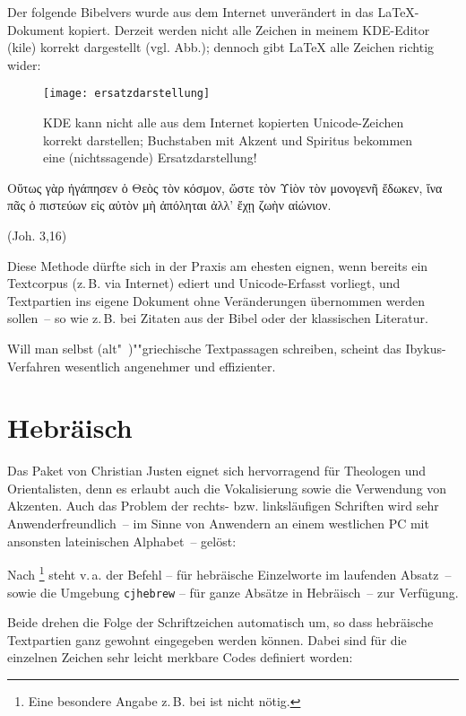 Der folgende Bibelvers wurde aus dem Internet unverändert in das \LaTeX-Dokument
kopiert. Derzeit werden nicht alle Zeichen in meinem KDE-Editor (kile) korrekt dargestellt (vgl. Abb.);
dennoch gibt \LaTeX{} alle Zeichen richtig wider:

\begin{figure}
 \texttt{[image: ersatzdarstellung]}
 \caption{KDE kann nicht alle aus dem Internet kopierten Unicode-Zeichen korrekt darstellen;
 Buchstaben mit Akzent und Spiritus bekommen eine (nichtssagende) Ersatzdarstellung!}
\end{figure}


\begin{otherlanguage}{polutonikogreek}
Οὕτως γὰρ ἠγάπησεν ὁ Θεὸς τὸν κόσμον, ὥστε τὸν Υἱὸν τὸν μονογενῆ ἔδωκεν,
ἵνα πᾶς ὁ πιστεύων εἰς αὐτὸν μὴ ἀπόληται ἀλλ’ ἔχῃ ζωὴν αἰώνιον.
\end{otherlanguage}
(Joh. 3,16)

Diese Methode dürfte sich in der Praxis am ehesten eignen, wenn bereits ein Textcorpus
(z.\,B. via Internet) ediert und Unicode-Erfasst vorliegt, und Textpartien ins eigene Dokument
ohne Veränderungen übernommen werden sollen~-- so wie z.\,B. bei Zitaten aus der Bibel oder
der klassischen Literatur.

Will man selbst (alt"~)""griechische Textpassagen schreiben, scheint das Ibykus-Verfahren
wesentlich angenehmer und effizienter.


\section{Hebräisch}

Das Paket  von Christian Justen eignet sich hervorragend für
Theologen und Orientalisten, denn es erlaubt auch die Vokalisierung sowie die Verwendung
von Akzenten. Auch das Problem der rechts- bzw. linksläufigen Schriften wird sehr
Anwenderfreundlich~-- im Sinne von Anwendern an einem westlichen PC mit ansonsten
lateinischen Alphabet~-- gelöst:

Nach %
\footnote{Eine besondere Angabe z.\,B. bei  ist nicht nötig.}
steht v.\,a. der Befehl 
-- für hebräische Einzelworte im laufenden Absatz~-- sowie die
Umgebung \lstinline/cjhebrew/
-- für ganze Absätze in Hebräisch~-- zur Verfügung.

Beide drehen die Folge der Schriftzeichen automatisch um, so dass hebräische Textpartien
ganz gewohnt eingegeben werden können. Dabei sind für die einzelnen Zeichen sehr leicht
merkbare Codes definiert worden:

